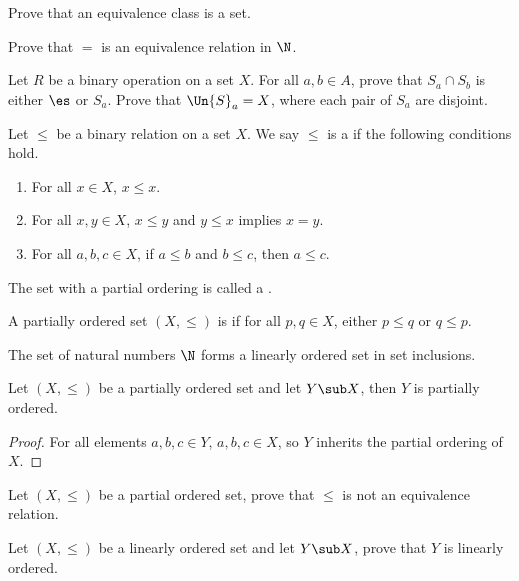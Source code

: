 \documentclass[10pt]{article}
\begin{document}
\begin{problem}
    Prove that an equivalence class is a set.
\end{problem}
\begin{problem}
    Prove that $=$ is an equivalence relation in $\N$.
\end{problem}
\begin{problem}
    Let $R$ be a binary operation on a set $X$. For all $a,b\in A$, prove that ${S}_{a}\cap{S}_{b}$ is either $\es$ or ${S}_{a}$. Prove that $\Un{S}_{a}=X$, where each pair of ${S}_{a}$ are disjoint.
\end{problem}
\begin{definition}
    Let $\le$ be a binary relation on a set $X$. We say $\le$ is a  if the following conditions hold.
    \begin{enumerate}
        \item For all $x\in X$, $x\le x$.
        \item For all $x,y\in X$, $x\le y$ and $y\le x$ implies $x=y$.
        \item For all $a,b,c\in X$, if $a\le b$ and $b\le c$, then $a\le c$.
    \end{enumerate}
    The set with a partial ordering is called a .
\end{definition}
\begin{definition}
    A partially ordered set $(X,\le)$ is  if for all $p,q\in X$, either $p\le q$ or $q\le p$.
\end{definition}
\begin{example}
    The set of natural numbers $\N$ forms a linearly ordered set in set inclusions.
\end{example}
\begin{proposition}
    Let $(X,\le)$ be a partially ordered set and let $Y\sub X$, then $Y$ is partially ordered.
\end{proposition}
\begin{proof}
    For all elements $a,b,c\in Y$, $a,b,c\in X$, so $Y$ inherits the partial ordering of $X$.
\end{proof}
\begin{problem}
    Let $(X,\le)$ be a partial ordered set, prove that $\le$ is not an equivalence relation.
\end{problem}
\begin{problem}
    Let $(X,\le)$ be a linearly ordered set and let $Y\sub X$, prove that $Y$ is linearly ordered.
\end{problem}
\end{document}
